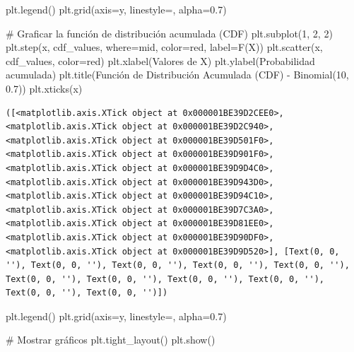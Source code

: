 \documentclass[
  letterpaper,
  DIV=11,
  numbers=noendperiod]{scrreprt}
\newenvironment{Shaded}{\begin{snugshade}}{\end{snugshade}}
\newcommand{\CommentTok}[1]{\textcolor[rgb]{0.37,0.37,0.37}{#1}}
\newcommand{\DecValTok}[1]{\textcolor[rgb]{0.68,0.00,0.00}{#1}}
\newcommand{\FloatTok}[1]{\textcolor[rgb]{0.68,0.00,0.00}{#1}}
\newcommand{\NormalTok}[1]{\textcolor[rgb]{0.00,0.23,0.31}{#1}}
\newcommand{\OperatorTok}[1]{\textcolor[rgb]{0.37,0.37,0.37}{#1}}
\newcommand{\StringTok}[1]{\textcolor[rgb]{0.13,0.47,0.30}{#1}}
\begin{document}
\begin{Shaded}
\begin{Highlighting}[]
\NormalTok{plt.legend()}
\NormalTok{plt.grid(axis}\OperatorTok{=}\StringTok{\textquotesingle{}y\textquotesingle{}}\NormalTok{, linestyle}\OperatorTok{=}\StringTok{\textquotesingle{}{-}{-}\textquotesingle{}}\NormalTok{, alpha}\OperatorTok{=}\FloatTok{0.7}\NormalTok{)}

\CommentTok{\# Graficar la función de distribución acumulada (CDF)}
\NormalTok{plt.subplot(}\DecValTok{1}\NormalTok{, }\DecValTok{2}\NormalTok{, }\DecValTok{2}\NormalTok{)}
\NormalTok{plt.step(x, cdf\_values, where}\OperatorTok{=}\StringTok{\textquotesingle{}mid\textquotesingle{}}\NormalTok{, color}\OperatorTok{=}\StringTok{\textquotesingle{}red\textquotesingle{}}\NormalTok{, label}\OperatorTok{=}\StringTok{\textquotesingle{}F(X)\textquotesingle{}}\NormalTok{)}
\NormalTok{plt.scatter(x, cdf\_values, color}\OperatorTok{=}\StringTok{\textquotesingle{}red\textquotesingle{}}\NormalTok{)}
\NormalTok{plt.xlabel(}\StringTok{\textquotesingle{}Valores de X\textquotesingle{}}\NormalTok{)}
\NormalTok{plt.ylabel(}\StringTok{\textquotesingle{}Probabilidad acumulada\textquotesingle{}}\NormalTok{)}
\NormalTok{plt.title(}\StringTok{\textquotesingle{}Función de Distribución Acumulada (CDF) {-} Binomial(10, 0.7)\textquotesingle{}}\NormalTok{)}
\NormalTok{plt.xticks(x)}
\end{Highlighting}
\end{Shaded}

\begin{verbatim}
([<matplotlib.axis.XTick object at 0x000001BE39D2CEE0>, <matplotlib.axis.XTick object at 0x000001BE39D2C940>, <matplotlib.axis.XTick object at 0x000001BE39D501F0>, <matplotlib.axis.XTick object at 0x000001BE39D901F0>, <matplotlib.axis.XTick object at 0x000001BE39D9D4C0>, <matplotlib.axis.XTick object at 0x000001BE39D943D0>, <matplotlib.axis.XTick object at 0x000001BE39D94C10>, <matplotlib.axis.XTick object at 0x000001BE39D7C3A0>, <matplotlib.axis.XTick object at 0x000001BE39D81EE0>, <matplotlib.axis.XTick object at 0x000001BE39D90DF0>, <matplotlib.axis.XTick object at 0x000001BE39D9D520>], [Text(0, 0, ''), Text(0, 0, ''), Text(0, 0, ''), Text(0, 0, ''), Text(0, 0, ''), Text(0, 0, ''), Text(0, 0, ''), Text(0, 0, ''), Text(0, 0, ''), Text(0, 0, ''), Text(0, 0, '')])
\end{verbatim}

\begin{Shaded}
\begin{Highlighting}[]
\NormalTok{plt.legend()}
\NormalTok{plt.grid(axis}\OperatorTok{=}\StringTok{\textquotesingle{}y\textquotesingle{}}\NormalTok{, linestyle}\OperatorTok{=}\StringTok{\textquotesingle{}{-}{-}\textquotesingle{}}\NormalTok{, alpha}\OperatorTok{=}\FloatTok{0.7}\NormalTok{)}

\CommentTok{\# Mostrar gráficos}
\NormalTok{plt.tight\_layout()}
\NormalTok{plt.show()}
\end{Highlighting}
\end{Shaded}
\end{document}
